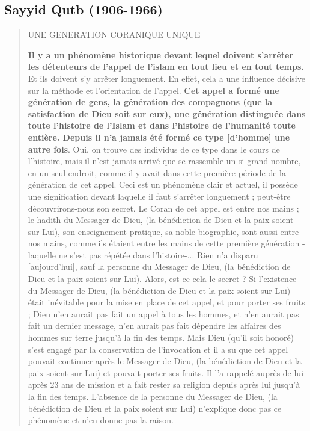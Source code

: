 \hypertarget{sayyid-qutb-1906-1966}{%
\subsection{\texorpdfstring{{Sayyid Qutb
(1906-1966)}}{Sayyid Qutb (1906-1966)}}\label{sayyid-qutb-1906-1966}}

\begin{quote}
UNE GENERATION CORANIQUE UNIQUE

\textbf{Il y a un phénomène historique devant lequel doivent s'arrêter
les détenteurs de l'appel de l'islam en tout lieu et en tout temps.} Et
ils doivent s'y arrêter longuement. En effet, cela a une influence
décisive sur la méthode et l'orientation de l'appel. \textbf{Cet appel a
formé une génération de gens, la génération des compagnons (que la
satisfaction de Dieu soit sur eux), une génération distinguée dans toute
l'histoire de l'Islam et dans l'histoire de l'humanité toute entière.
Depuis il n'a jamais été formé ce type {[}d'homme{]} une autre fois}.
Oui, on trouve des individus de ce type dans le cours de l'histoire,
mais il n'est jamais arrivé que se rassemble un si grand nombre, en un
seul endroit, comme il y avait dans cette première période de la
génération de cet appel. Ceci est un phénomène clair et actuel, il
possède une signification devant laquelle il faut s'arrêter longuement ;
peut-être découvrirons-nous son secret. Le Coran de cet appel est entre
nos mains ; le hadith du Messager de Dieu, (la bénédiction de Dieu et la
paix soient sur Lui), son enseignement pratique, sa noble biographie,
sont aussi entre nos mains, comme ils étaient entre les mains de cette
première génération - laquelle ne s'est pas répétée dans l'histoire-...
Rien n'a disparu {[}aujourd'hui{]}, sauf la personne du Messager de
Dieu, (la bénédiction de Dieu et la paix soient sur Lui). Alors, est-ce
cela le secret ? Si l'existence du Messager de Dieu, (la bénédiction de
Dieu et la paix soient sur Lui) était inévitable pour la mise en place
de cet appel, et pour porter ses fruits ; Dieu n'en aurait pas fait un
appel à tous les hommes, et n'en aurait pas fait un dernier message,
n'en aurait pas fait dépendre les affaires des hommes sur terre jusqu'à
la fin des temps. Mais Dieu (qu'il soit honoré) s'est engagé par la
conservation de l'invocation et il a su que cet appel pouvait continuer
après le Messager de Dieu, (la bénédiction de Dieu et la paix soient sur
Lui) et pouvait porter ses fruits. Il l'a rappelé auprès de lui après 23
ans de mission et a fait rester sa religion depuis après lui jusqu'à la
fin des temps. L'absence de la personne du Messager de Dieu, (la
bénédiction de Dieu et la paix soient sur Lui) n'explique donc pas ce
phénomène et n'en donne pas la raison.


\end{quote}
